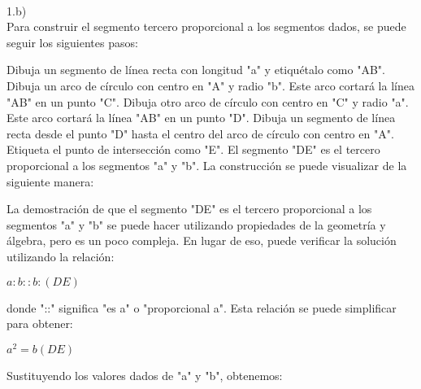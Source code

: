 \documentclass{article}
\begin{document}
\\
{\Large 1.b)}
\\
Para construir el segmento tercero proporcional a los segmentos dados, se puede seguir los siguientes pasos:

Dibuja un segmento de línea recta con longitud "a" y etiquétalo como "AB".
Dibuja un arco de círculo con centro en "A" y radio "b". Este arco cortará la línea "AB" en un punto "C".
Dibuja otro arco de círculo con centro en "C" y radio "a". Este arco cortará la línea "AB" en un punto "D".
Dibuja un segmento de línea recta desde el punto "D" hasta el centro del arco de círculo con centro en "A". Etiqueta el punto de intersección como "E".
El segmento "DE" es el tercero proporcional a los segmentos "a" y "b".
La construcción se puede visualizar de la siguiente manera:

La demostración de que el segmento "DE" es el tercero proporcional a los segmentos "a" y "b" se puede hacer utilizando propiedades de la geometría y álgebra, pero es un poco compleja. En lugar de eso, puede verificar la solución utilizando la relación:

$a:b::b:(DE)$

donde "::" significa "es a" o "proporcional a". Esta relación se puede simplificar para obtener:

$a^2 = b(DE)$

Sustituyendo los valores dados de "a" y "b", obtenemos:
\end{document}
